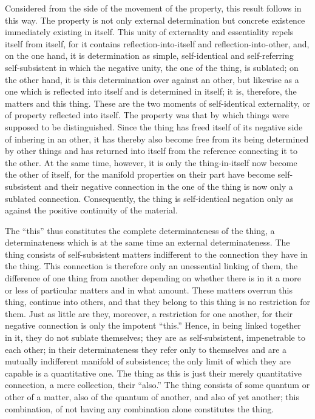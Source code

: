 Considered from the side of the movement of the property,
this result follows in this way.
The property is not only external determination
but concrete existence immediately existing in itself.
This unity of externality and essentiality repels itself from itself,
for it contains reflection-into-itself and reflection-into-other,
and, on the one hand, it is determination as simple,
self-identical and self-referring self-subsistent
in which the negative unity,
the one of the thing, is sublated;
on the other hand, it is this determination over against an other,
but likewise as a one which is reflected into itself
and is determined in itself;
it is, therefore, the matters and this thing.
These are the two moments of self-identical externality,
or of property reflected into itself.
The property was that by which things
were supposed to be distinguished.
Since the thing has freed itself of its
negative side of inhering in an other,
it has thereby also become free
from its being determined by other things
and has returned into itself
from the reference connecting it to the other.
At the same time, however, it is only the thing-in-itself
now become the other of itself,
for the manifold properties on their part
have become self-subsistent
and their negative connection
in the one of the thing is
now only a sublated connection.
Consequently, the thing is self-identical negation
only as against the positive continuity of the material.

The “this” thus constitutes the
complete determinateness of the thing,
a determinateness which is at the same time
an external determinateness.
The thing consists of self-subsistent matters
indifferent to the connection they have in the thing.
This connection is therefore only
an unessential linking of them,
the difference of one thing from another
depending on whether there is in it
a more or less of particular matters
and in what amount.
These matters overrun this thing,
continue into others,
and that they belong to this thing
is no restriction for them.
Just as little are they, moreover,
a restriction for one another,
for their negative connection is
only the impotent “this.”
Hence, in being linked together in it,
they do not sublate themselves;
they are as self-subsistent,
impenetrable to each other;
in their determinateness they refer only to themselves
and are a mutually indifferent manifold of subsistence;
the only limit of which they are capable is a quantitative one.
The thing as this is just their merely quantitative connection,
a mere collection, their “also.”
The thing consists of some quantum or other of a matter,
also of the quantum of another, and also of yet another;
this combination, of not having any combination
alone constitutes the thing.

